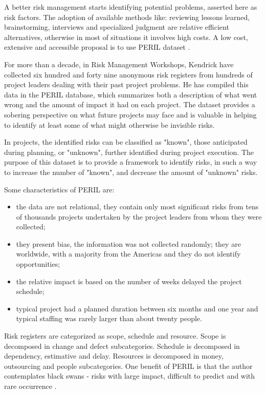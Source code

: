 \documentclass[a4paper,twoside]{article}
\begin{document}
\noindent A better risk management starts identifying potential problems, asserted here as risk factors. The adoption of available methods like: reviewing lessons learned, brainstorming, interviews and specialized judgment are relative efficient alternatives, otherwise in most of situations it involves high costs. A low cost, extensive and accessible proposal is to use PERIL dataset \cite{kendrick2003identifying}.

For more than a decade, in Risk Management Workshops, Kendrick \cite{kendrick2003identifying} have collected six hundred and forty nine anonymous risk registers from hundreds of project leaders dealing with their past project problems. He has compiled this data in the PERIL database, which summarizes both a description of what went wrong and the amount of impact it had on each project. The dataset provides a sobering perspective on what future projects may face and is valuable in helping to identify at least some of what might otherwise be invisible risks.

In projects, the identified risks can be classified as "known", those anticipated during planning, or "unknown", further identified during project execution. The purpose of this dataset is to provide a framework to identify risks, in such a way to increase the number of "known", and decrease the amount of "unknown" risks.

Some characteristics of PERIL are: 
\begin{itemize}
\item the data are not relational, they contain only most significant risks from tens of thousands projects undertaken by the project leaders from whom they were collected;
\item they present bias, the information was not collected randomly; they are worldwide, with a majority from the Americas and they do not identify opportunities; 
\item the relative impact is based on the number of weeks delayed the project schedule;
\item typical project had a planned duration between six months and one year and typical staffing was rarely larger than about twenty people.
\end{itemize}

Risk registers are categorized as scope, schedule and resource. Scope is decomposed in change and defect subcategories. Schedule is decomposed in dependency, estimative and delay. Resources is decomposed in money, outsourcing and people subcategories. One benefit of PERIL is that the author contemplates black swans - risks with large impact, difficult to predict and with rare occurrence \cite{taleb2001fooled}. 
\end{document}
